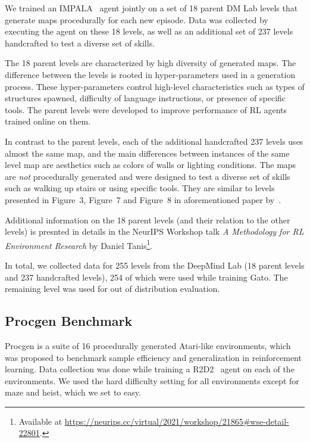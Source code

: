 \documentclass[10pt]{article} \usepackage[accepted]{tmlr}
\newcommand{\model}{{Gato}}
\begin{document}
We trained an IMPALA~\citep{espeholt2018impala} agent jointly on a set of 18 parent DM Lab levels that generate maps procedurally for each new episode.
Data was collected by executing the agent on these 18 levels, as well as an additional set of 237 levels handcrafted to test a diverse set of skills.


The 18 parent levels are characterized by high diversity of generated maps.
The difference between the levels is rooted in hyper-parameters used in a generation process.
These hyper-parameters control high-level characteristics such as types of structures spawned, difficulty of language instructions, or presence of specific tools.
The parent levels were developed to improve performance of RL agents trained online on them.


In contrast to the parent levels, each of the additional handcrafted 237 levels uses almost the same map, and the main differences between instances of the same level map are aesthetics such as colors of walls or lighting conditions.
The maps are \emph{not} procedurally generated and were designed to test a diverse set of skills such as walking up stairs or using specific tools.
They are similar to levels presented in Figure~3, Figure~7 and Figure~8 in aforementioned paper by~\citet{beattie2016deepmind}.


Additional information on the 18 parent levels (and their relation to the other levels) is presnted in details in the NeurIPS Workshop talk \emph{A Methodology for RL Environment Research} by Daniel Tanis\footnote{Available at \url{https://neurips.cc/virtual/2021/workshop/21865\#wse-detail-22801}.}.


In total, we collected data for 255 levels from the DeepMind Lab (18 parent levels and 237 handcrafted levels), 254 of which were used while training \model. The remaining level was used for out of distribution evaluation.


\vskip 0.4cm
\subsection{Procgen Benchmark}
\vskip 0.2cm
Procgen \citep{cobbe2020leveraging} is a suite of 16 procedurally generated Atari-like environments, which was proposed to benchmark sample efficiency
and generalization in reinforcement learning. Data collection was done while training a R2D2~\citep{kapturowski2018recurrent} agent
on each of the environments. We used the hard difficulty setting for all environments except for maze and heist, which we set to easy.
\end{document}
